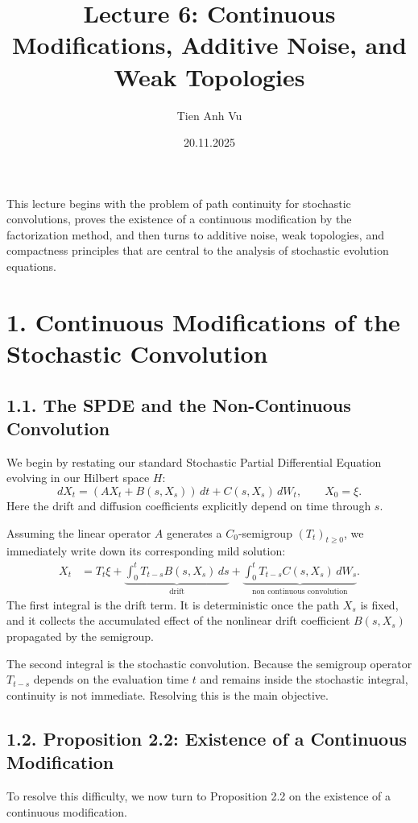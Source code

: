 \documentclass[11pt]{article}
\title{Lecture 6: Continuous Modifications, Additive Noise, and Weak Topologies}
\date{20.11.2025}
\author{Tien Anh Vu}
\theoremstyle{definition}
\theoremstyle{remark}
\begin{document}
\maketitle

This lecture begins with the problem of path continuity for stochastic convolutions, proves the existence of a continuous modification by the factorization method, and then turns to additive noise, weak topologies, and compactness principles that are central to the analysis of stochastic evolution equations.

\section*{1. Continuous Modifications of the Stochastic Convolution}

\subsection*{1.1. The SPDE and the Non-Continuous Convolution}
We begin by restating our standard Stochastic Partial Differential Equation evolving in our Hilbert space \(H\):
\[
dX_t=(AX_t+B(s,X_s))\,dt+C(s,X_s)\,dW_t,
\qquad
X_0=\xi.
\]
Here the drift and diffusion coefficients explicitly depend on time through \(s\).

Assuming the linear operator \(A\) generates a \(C_0\)-semigroup \((T_t)_{t\ge 0}\), we immediately write down its corresponding mild solution:
\begin{align*}
X_t
&=
T_t\xi
+\underbrace{\int_0^t T_{t-s}B(s,X_s)\,ds}_{\text{drift}}
+\underbrace{\int_0^t T_{t-s}C(s,X_s)\,dW_s}_{\text{non continuous convolution}}.
\end{align*}
The first integral is the drift term. It is deterministic once the path \(X_s\) is fixed, and it collects the accumulated effect of the nonlinear drift coefficient \(B(s,X_s)\) propagated by the semigroup.

The second integral is the stochastic convolution. Because the semigroup operator \(T_{t-s}\) depends on the evaluation time \(t\) and remains inside the stochastic integral, continuity is not immediate. Resolving this is the main objective.

\subsection*{1.2. Proposition 2.2: Existence of a Continuous Modification}
To resolve this difficulty, we now turn to Proposition 2.2 on the existence of a continuous modification.
\end{document}
